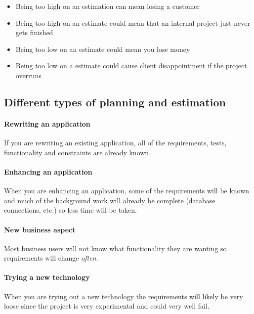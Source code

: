 \begin{itemize}
	\item Being too high on an estimation can mean losing a customer
	\item Being too high on an estimate could mean that an internal project just never gets finished
	\item Being too low on an estimate could mean you lose money
	\item Being too low on a estimate could cause client disappointment if the project overruns
\end{itemize}

\subsection{Different types of planning and estimation}\label{sub:different_types_of_planning_and_estimation}

\paragraph{Rewriting an application}\label{par:rewriting_an_application}

If you are rewriting an existing application, all of the requirements, tests, functionality and constraints are already known.

\paragraph{Enhancing an application}\label{par:enhancing_an_application}

When you are enhancing an application, some of the requirements will be known and much of the background work will already be complete (database connections, etc.) so less time will be taken.

\paragraph{New business aspect}\label{par:new_business_aspect}

Most business users will not know what functionality they are wanting so requirements will change \emph{often}.

\paragraph{Trying a new technology}\label{par:trying_a_new_technology}

When you are trying out a new technology the requirements will likely be very loose since the project is very experimental and could very well fail.

